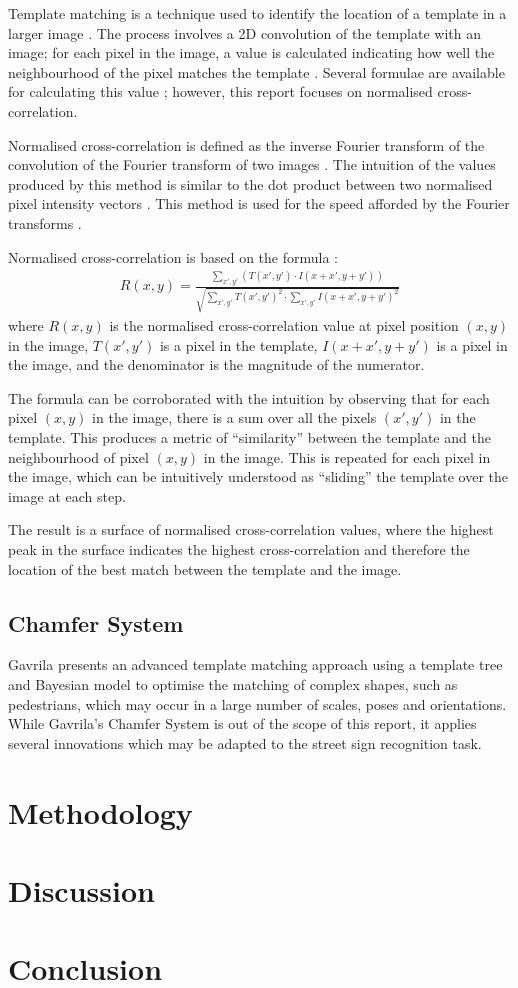 Template matching is a technique used to identify the location of a template in a larger image \cite{opencv_tm}. The process involves a 2D convolution of the template with an image; for each pixel in the image, a value is calculated indicating how well the neighbourhood of the pixel matches the template \cite{opencv_tm}. Several formulae are available for calculating this value \cite{opencv_tm}; however, this report focuses on normalised cross-correlation.

Normalised cross-correlation is defined as the inverse Fourier transform of the convolution of the Fourier transform of two images \cite{psi_2016}. The intuition of the values produced by this method is similar to the dot product between two normalised pixel intensity vectors \cite{psi_2016}. This method is used for the speed afforded by the Fourier transforms \cite{psi_2016}.

Normalised cross-correlation is based on the formula \cite{opencv_tm}:
\begin{align}
  R(x,y) = \frac{\sum_{x',y'}\left(T(x',y')\cdot I(x+x',y+y')\right)}{\sqrt{\sum_{x',y'} T(x',y')^2 \cdot \sum_{x',y'} I(x+x',y+y')^2}}
\end{align}
where $R(x,y)$ is the normalised cross-correlation value at pixel position $(x,y)$ in the image, $T(x',y')$ is a pixel in the template, $I(x+x', y+y')$ is a pixel in the image, and the denominator is the magnitude of the numerator.

The formula can be corroborated with the intuition by observing that for each pixel $(x,y)$ in the image, there is a sum over all the pixels $(x',y')$ in the template. This produces a metric of ``similarity'' between the template and the neighbourhood of pixel $(x,y)$ in the image. This is repeated for each pixel in the image, which can be intuitively understood as ``sliding'' the template over the image at each step.

The result is a surface of normalised cross-correlation values, where the highest peak in the surface indicates the highest cross-correlation and therefore the location of the best match between the template and the image.

\subsection{Chamfer System}

Gavrila \cite{gavrila_2007} \cite{gavrila_nd} presents an advanced template matching approach using a template tree and Bayesian model to optimise the matching of complex shapes, such as pedestrians, which may occur in a large number of scales, poses and orientations. While Gavrila's Chamfer System \cite{gavrila_nd} is out of the scope of this report, it applies several innovations which may be adapted to the street sign recognition task.

\section{Methodology}

\section{Discussion}

\section{Conclusion}
